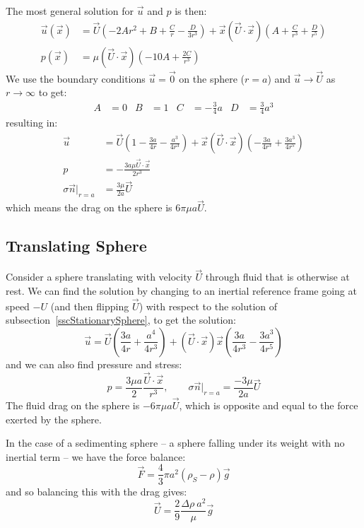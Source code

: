 \documentclass[../Main.tex]{subfiles}
\begin{document}
The most general solution for $\vec u$ and $p$ is then:
\begin{align*}
    \vec u(\vec x) &=  \vec U \left(-2Ar^2 + B + \frac C r - \frac D {3r^3}\right) + \vec x (\vec{U} \cdot \vec{x}) \left(A + \frac C {r^3} + \frac D {r^5}\right) \\
    p(\vec x) &= \mu (\vec{U} \cdot \vec{x}) \left(-10A + \frac{2C}{r^3}\right)
\end{align*}
We use the boundary conditions $\vec u = \vec0$ on the sphere ($r = a$) and $\vec u \to \vec U$ as $r \to \infty$ to get:
\begin{align*}
    A &= 0 & B &= 1 & C &= -\frac34a & D &= \frac34a^3
\end{align*}
resulting in:
\begin{align*}
    \vec u &= \vec U \left(1 - \frac{3a}{4r} - \frac{a^3}{4r^3}\right) + \vec x (\vec{U} \cdot \vec{x}) \left(-\frac{3a}{4r^3} + \frac{3a^3}{4r^5}\right) \\
    p &= -\frac{3a\mu \vec{U} \cdot \vec{x}}{2r^3} \\
    \sigma \vec{n} |_{r = a} &= \frac{3\mu}{2a}\vec U
\end{align*}
which means the drag on the sphere is $6\pi \mu a \vec U$.
\subsection{Translating Sphere}
Consider a sphere translating with velocity $\vec{U}$ through fluid that is otherwise at rest. We can find the solution by changing to an inertial reference frame going at speed $-U$ (and then flipping $\vec{U}$) with respect to the solution of subsection~\ref{sscStationarySphere}, to get the solution:
\begin{equation*}
    \vec{u} = \vec{U} \left(\frac{3a}{4r} + \frac{a^4}{4r^3}\right) + (\vec{U} \cdot \vec{x}) \vec{x} \left(\frac{3a}{4r^3} - \frac{3a^3}{4r^5}\right)
\end{equation*}
and we can also find pressure and stress:
\begin{equation*}
    p = \frac{3\mu a}{2} \frac{\vec{U} \cdot \vec{x}}{r^3},\qquad \sigma \vec{n}|_{r = a} = \frac{-3\mu}{2a} \vec{U}
\end{equation*}
The fluid drag on the sphere is $-6\pi \mu a \vec{U}$, which is opposite and equal to the force exerted by the sphere.

In the case of a sedimenting sphere -- a sphere falling under its weight with no inertial term -- we have the force balance:
\begin{equation*}
    \vec{F} = \frac43 \pi a^2 (\rho_S - \rho) \vec{g}
\end{equation*}
and so balancing this with the drag gives:
\begin{equation*}
    \vec{U} = \frac29 \frac{\Delta \rho~a^2}{\mu}\vec{g}
\end{equation*}
\end{document}
